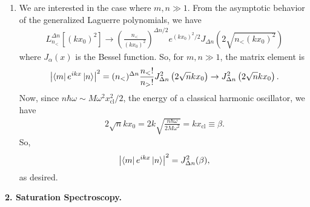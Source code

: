 \documentclass{article}
\theoremstyle{definition}
\newcommand{\al}{\alpha}
\newcommand{\be}{\beta}
\newcommand{\f}[2]{\frac{#1}{#2}}
\newcommand{\lp}{\left(}
\newcommand{\rp}{\right)}
\begin{document}
\begin{enumerate}[label = (\alph*)]
	\item We are interested in the case where $m,n \gg 1$. From the asymptotic behavior of the generalized Laguerre polynomials, we have
	\begin{align*}
	L^{\Delta n}_{n_<}[(kx_0)^2] \to \lp \f{n_<}{(kx_0)^2} \rp^{\Delta n / 2} e^{(kx_0)^2/2} J_{\Delta n} \lp 2\sqrt{n_< (kx_0)^2}\rp 
	\end{align*}
	where $J_\al(x)$ is the Bessel function. So, for $m,n \gg 1$, the matrix element is 
	\begin{align*}
	\abs{\bra{m} e^{ikx} \ket{n}}^2 = (n_<)^{\Delta n} \f{n_<!}{n_>!} J^2_{\Delta n}\lp 2 \sqrt{n} kx_0 \rp \to J^2_{\Delta n} \lp 2\sqrt{n} kx_0 \rp.
	\end{align*}
	Now, since $n\hbar \omega\sim M\omega^2 x_{\text{cl}}^2/2$, the energy of a classical harmonic oscillator, we have
	\begin{align*}
	2\sqrt{n} k x_0 = 2k \sqrt{\f{n \hbar \omega}{2M\omega^2}} = kx_\text{cl} \equiv \be.
	\end{align*}
	So, 
	\begin{align*}
	\abs{\bra{m} e^{ikx} \ket{n}}^2  = J^2_{\Delta n}(\be),
	\end{align*}
	as desired. 
	
\end{enumerate}

\noindent \textbf{2. Saturation Spectroscopy.}
\end{document}
